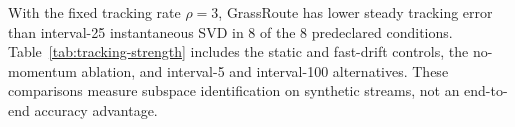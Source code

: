 With the fixed tracking rate $\rho=3$, GrassRoute has lower steady tracking error than interval-25 instantaneous SVD in 8 of the 8 predeclared conditions. Table~\ref{tab:tracking-strength} includes the static and fast-drift controls, the no-momentum ablation, and interval-5 and interval-100 alternatives. These comparisons measure subspace identification on synthetic streams, not an end-to-end accuracy advantage.
